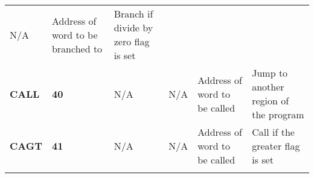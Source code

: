 \documentclass[]{article}
\begin{document}
\begin{longtable}[c]{@{}llllll@{}}
\begin{minipage}[t]{0.14\columnwidth}
N/A
\strut\end{minipage} &
\begin{minipage}[t]{0.14\columnwidth}\raggedright\strut
Address of word to be branched to
\strut\end{minipage} &
\begin{minipage}[t]{0.14\columnwidth}\raggedright\strut
Branch if divide by zero flag is set
\strut\end{minipage}\tabularnewline
\begin{minipage}[t]{0.14\columnwidth}\raggedright\strut
\textbf{CALL}
\strut\end{minipage} &
\begin{minipage}[t]{0.14\columnwidth}\raggedright\strut
\textbf{40}
\strut\end{minipage} &
\begin{minipage}[t]{0.14\columnwidth}\raggedright\strut
N/A
\strut\end{minipage} &
\begin{minipage}[t]{0.14\columnwidth}\raggedright\strut
N/A
\strut\end{minipage} &
\begin{minipage}[t]{0.14\columnwidth}\raggedright\strut
Address of word to be called
\strut\end{minipage} &
\begin{minipage}[t]{0.14\columnwidth}\raggedright\strut
Jump to another region of the program
\strut\end{minipage}\tabularnewline
\begin{minipage}[t]{0.14\columnwidth}\raggedright\strut
\textbf{CAGT}
\strut\end{minipage} &
\begin{minipage}[t]{0.14\columnwidth}\raggedright\strut
\textbf{41}
\strut\end{minipage} &
\begin{minipage}[t]{0.14\columnwidth}\raggedright\strut
N/A
\strut\end{minipage} &
\begin{minipage}[t]{0.14\columnwidth}\raggedright\strut
N/A
\strut\end{minipage} &
\begin{minipage}[t]{0.14\columnwidth}\raggedright\strut
Address of word to be called
\strut\end{minipage} &
\begin{minipage}[t]{0.14\columnwidth}\raggedright\strut
Call if the greater flag is set
\strut\end{minipage}\tabularnewline
\begin{minipage}[t]{0.14\columnwidth}\raggedright\strut

\end{minipage}
\end{longtable}
\end{document}
